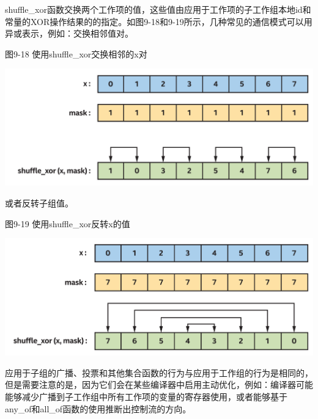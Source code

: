 shuffle\_xor函数交换两个工作项的值，这些值由应用于工作项的子工作组本地id和常量的XOR操作结果的的指定。如图9-18和9-19所示，几种常见的通信模式可以用异或表示，例如：交换相邻值对。\par

\hspace*{\fill} \par %
图9-18 使用shuffle\_xor交换相邻的x对
\begin{center}
	\includegraphics[width=1.\textwidth]{content/chapter-9/images/11}
\end{center}

或者反转子组值。\par

\hspace*{\fill} \par %
图9-19 使用shuffle\_xor反转x的值
\begin{center}
	\includegraphics[width=1.\textwidth]{content/chapter-9/images/12}
\end{center}

\begin{tcolorbox}[colback=blue!5!white,colframe=blue!75!black, title=使用优化的广播，投票和集合函数]
应用于子组的广播、投票和其他集合函数的行为与应用于工作组的行为是相同的，但是需要注意的是，因为它们会在某些编译器中启用主动优化，例如：编译器可能能够减少广播到子工作组中所有工作项的变量的寄存器使用，或者能够基于any\_of和all\_of函数的使用推断出控制流的方向。
\end{tcolorbox}


